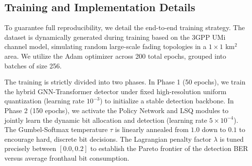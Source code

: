 \subsection{Training and Implementation Details}
To guarantee full reproducibility, we detail the end-to-end training strategy. The dataset is dynamically generated during training based on the 3GPP UMi channel model, simulating random large-scale fading topologies in a $1\times 1$ km$^2$ area. We utilize the Adam optimizer across 200 total epochs, grouped into batches of size 256. 

The training is strictly divided into two phases. In Phase 1 (50 epochs), we train the hybrid GNN-Transformer detector under fixed high-resolution uniform quantization (learning rate $10^{-3}$) to initialize a stable detection backbone. In Phase 2 (150 epochs), we activate the Policy Network and LSQ modules to jointly learn the dynamic bit allocation and detection (learning rate $5\times 10^{-4}$). The Gumbel-Softmax temperature $\tau$ is linearly annealed from $1.0$ down to $0.1$ to encourage hard, discrete bit decisions. The Lagrangian penalty factor $\lambda$ is tuned precisely between $[0.0, 0.2]$ to establish the Pareto frontier of the detection BER versus average fronthaul bit consumption.